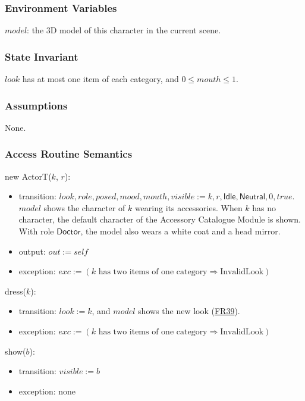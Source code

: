 \documentclass[10pt, titlepage]{article}
\newcommand{\srsurl}{https://team-hindsight.github.io/ophthamology-game/SRS/SRS.pdf}
\newcommand{\srsitemref}[2]{\href{\srsurl\#nameddest=#1}{#2}}
\newcommand{\T}[1]{\mathit{#1}}          %
\newcommand{\V}[1]{\mathsf{#1}}          %
\newcommand{\out}{\mathit{out}}
\newcommand{\exc}{\mathit{exc}}
\newcommand{\true}{\mathit{true}}
\begin{document}
\subsubsection{Environment Variables}

$\T{model}$: the 3D model of this character in the current scene.

\subsubsection{State Invariant}

$\T{look}$ has at most one item of each category, and $0 \leq \T{mouth} \leq
1$.

\subsubsection{Assumptions}

None.

\subsubsection{Access Routine Semantics}

\noindent new ActorT($k$, $r$):
\begin{itemize}
\item transition: $\T{look}, \T{role}, \T{posed}, \T{mood}, \T{mouth},
  \T{visible} := k, r, \V{Idle}, \V{Neutral}, 0, \true$. $\T{model}$ shows the
  character of $k$ wearing its accessories. When $k$ has no character, the
  default character of the Accessory Catalogue Module is shown. With role
  $\V{Doctor}$, the model also wears a white coat and a head mirror.
\item output: $\out := \T{self}$
\item exception: $\exc := (k \text{ has two items of one category}
  \Rightarrow \text{InvalidLook})$
\end{itemize}

\noindent dress($k$):
\begin{itemize}
\item transition: $\T{look} := k$, and $\T{model}$ shows the new look
  (\srsitemref{FR_Equip}{FR39}).
\item exception: $\exc := (k \text{ has two items of one category}
  \Rightarrow \text{InvalidLook})$
\end{itemize}

\noindent show($b$):
\begin{itemize}
\item transition: $\T{visible} := b$
\item exception: none
\end{itemize}
\end{document}

